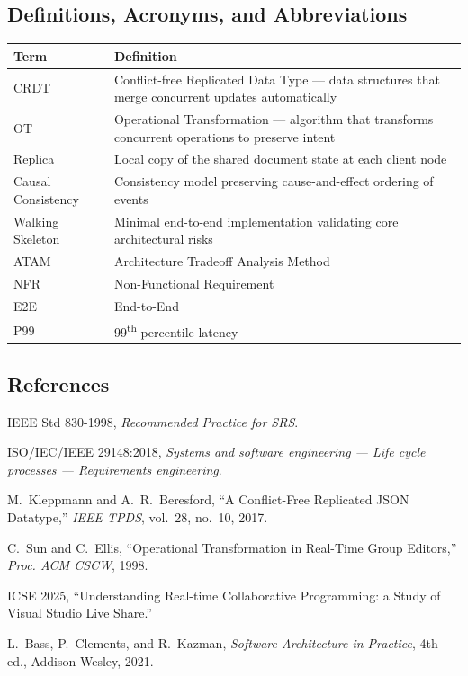 \documentclass[12pt, a4paper, oneside]{article}
\begin{document}
\subsection{Definitions, Acronyms, and Abbreviations}
\begin{table}[H]
\centering
\begin{tabularx}{\textwidth}{l X}
\toprule
\textbf{Term} & \textbf{Definition} \\
\midrule
CRDT   & Conflict-free Replicated Data Type --- data structures that merge concurrent updates automatically \\
OT     & Operational Transformation --- algorithm that transforms concurrent operations to preserve intent \\
Replica & Local copy of the shared document state at each client node \\
Causal Consistency & Consistency model preserving cause-and-effect ordering of events \\
Walking Skeleton & Minimal end-to-end implementation validating core architectural risks \\
ATAM   & Architecture Tradeoff Analysis Method \\
NFR    & Non-Functional Requirement \\
E2E    & End-to-End \\
P99    & 99\textsuperscript{th} percentile latency \\
\bottomrule
\end{tabularx}
\end{table}

\subsection{References}
\begin{enumerate}[label={[R\arabic*]}]
  \item IEEE Std 830-1998, \textit{Recommended Practice for SRS}.
  \item ISO/IEC/IEEE 29148:2018, \textit{Systems and software engineering --- Life cycle processes --- Requirements engineering}.
  \item M.~Kleppmann and A.~R.~Beresford, ``A Conflict-Free Replicated JSON Datatype,'' \textit{IEEE TPDS}, vol.~28, no.~10, 2017.
  \item C.~Sun and C.~Ellis, ``Operational Transformation in Real-Time Group Editors,'' \textit{Proc. ACM CSCW}, 1998.
  \item ICSE 2025, ``Understanding Real-time Collaborative Programming: a Study of Visual Studio Live Share.''
  \item L.~Bass, P.~Clements, and R.~Kazman, \textit{Software Architecture in Practice}, 4th ed., Addison-Wesley, 2021.
\end{enumerate}
\end{document}
